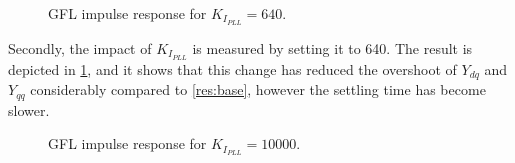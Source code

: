 \begin{figure}[ht]
\begin{center}
    \centering
   \nonindent
	\caption[GFL impulse response for $K_I_{PLL}=640$]{GFL impulse response for $K_I_{PLL}=640$.}
	\label{res:KIPLL(640)}
	\end{center}
\end{figure}

Secondly, the impact of $K_I_{PLL}$ is measured by setting it to 640. The result is depicted in \ref{res:KIPLL(640)}, and it shows that this change has reduced the overshoot of $Y_{dq}$ and $Y_{qq}$ considerably compared to \ref{res:base}, however the settling time has become slower.

\begin{figure}[ht]
\begin{center}
    \centering
   \nonindent
	\caption[GFL impulse response for $K_I_{PLL}=10000$]{GFL impulse response for $K_I_{PLL}=10000$.}
	\label{res:KIPLL(10000)}
	\end{center}
\end{figure}

